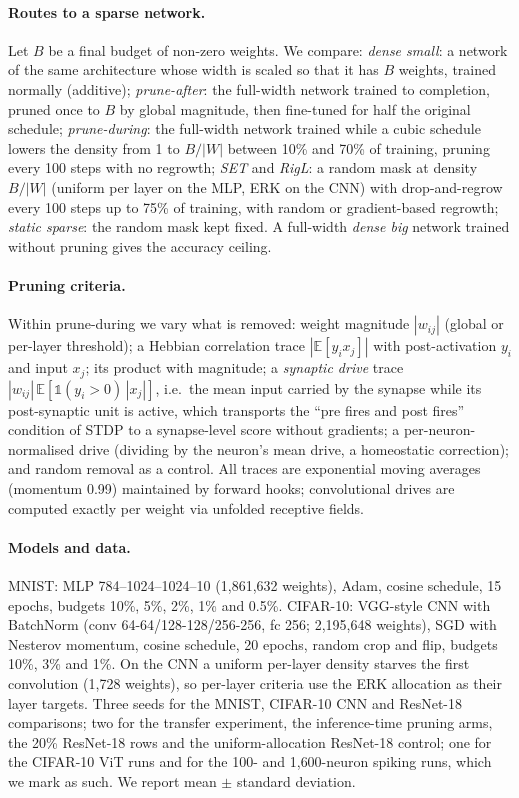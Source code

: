 \documentclass[11pt]{article}
\begin{document}
\paragraph{Routes to a sparse network.} Let $B$ be a final budget of non-zero weights. We compare:
\emph{dense small}: a network of the same architecture whose width is scaled so that it has $B$ weights, trained normally
(additive);
\emph{prune-after}: the full-width network trained to completion, pruned once to $B$ by global magnitude, then fine-tuned
for half the original schedule;
\emph{prune-during}: the full-width network trained while a cubic schedule \citep{zhu2017} lowers the density from 1 to
$B/|W|$ between 10\% and 70\% of training, pruning every 100 steps with no regrowth;
\emph{SET} and \emph{RigL}: a random mask at density $B/|W|$ (uniform per layer on the MLP, ERK on the CNN) with
drop-and-regrow every 100 steps up to 75\% of training, with random or gradient-based regrowth;
\emph{static sparse}: the random mask kept fixed.
A full-width \emph{dense big} network trained without pruning gives the accuracy ceiling.

\paragraph{Pruning criteria.} Within prune-during we vary what is removed: weight magnitude $|w_{ij}|$ (global or per-layer
threshold); a Hebbian correlation trace $|\mathbb{E}[y_i x_j]|$ with post-activation $y_i$ and input $x_j$; its product with
magnitude; a \emph{synaptic drive} trace $|w_{ij}|\,\mathbb{E}[\mathbb{1}(y_i>0)\,|x_j|]$, i.e.\ the mean input carried by the
synapse while its post-synaptic unit is active, which transports the ``pre fires and post fires'' condition of STDP to a
synapse-level score without gradients; a per-neuron-normalised drive (dividing by the neuron's mean drive, a homeostatic
correction); and random removal as a control. All traces are exponential moving averages (momentum 0.99) maintained by
forward hooks; convolutional drives are computed exactly per weight via unfolded receptive fields.

\paragraph{Models and data.} MNIST: MLP 784--1024--1024--10 (1{,}861{,}632 weights), Adam, cosine schedule, 15 epochs,
budgets 10\%, 5\%, 2\%, 1\% and 0.5\%. CIFAR-10: VGG-style CNN with BatchNorm (conv 64-64/128-128/256-256, fc 256;
2{,}195{,}648 weights), SGD with Nesterov momentum, cosine schedule, 20 epochs, random crop and flip, budgets 10\%, 3\% and 1\%.
On the CNN a uniform per-layer density starves the first convolution (1{,}728 weights), so per-layer criteria use the ERK
allocation as their layer targets. Three seeds for the MNIST, CIFAR-10 CNN and ResNet-18 comparisons; two for the transfer
experiment, the inference-time pruning arms, the 20\% ResNet-18 rows and the uniform-allocation ResNet-18 control; one for
the CIFAR-10 ViT runs and for the 100- and 1{,}600-neuron spiking runs, which we mark as such. We report mean $\pm$
standard deviation.
\end{document}
